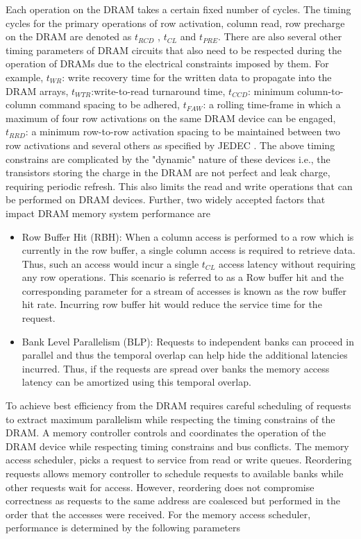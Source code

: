 \par Each operation on the DRAM takes a certain fixed number of cycles. The timing cycles for the primary operations of row activation, column read, row precharge on the DRAM are denoted as $t_{RCD}$ , $t_{CL}$ and $t_{PRE}$. There are also several other timing parameters of DRAM circuits that also need to be respected during the operation of DRAMs due to the electrical constraints imposed by them. For example, $t_{WR}$: write recovery time for the written data to propagate into the DRAM arrays, $t_{WTR}$:write-to-read turnaround time, $t_{CCD}$: minimum column-to-column command spacing to be adhered, $t_{FAW}$: a rolling time-frame in which a maximum of four row activations on the same DRAM device can be engaged, $t_{RRD}$: a minimum row-to-row activation spacing to be maintained between two row activations and several others as specified by JEDEC \cite{jedec-ddr3}. The above timing constrains are complicated by the "dynamic" nature of these devices i.e., the transistors storing the charge in the DRAM are not perfect and leak charge, requiring periodic refresh. This also limits the read and write operations that can be performed on DRAM devices.
Further, two widely accepted factors that impact DRAM memory system performance are
\begin{itemize}
	\item Row Buffer Hit (RBH): When a column access is performed to a row which is currently in the row buffer, a single column access is required to retrieve data. Thus, such an access would incur a single $t_{CL}$ access latency without requiring any row operations. This scenario is referred to as a Row buffer hit and the corresponding parameter for a stream of accesses is known as the row buffer hit rate. Incurring row buffer hit would reduce the service time for the request. 
	\item Bank Level Parallelism (BLP): Requests to independent banks can proceed in parallel and thus the temporal overlap can help hide the additional latencies incurred. Thus, if the requests are spread over banks the memory access latency can be amortized using this temporal overlap.
\end{itemize}
\par To achieve best efficiency from the DRAM requires careful scheduling of requests to extract maximum parallelism while respecting the timing constrains of the DRAM. A memory controller controls and coordinates the operation of the DRAM device while respecting timing constrains and bus conflicts. The memory access scheduler, picks a request to service from read or write queues. Reordering requests allows memory controller to schedule requests to available banks while other requests wait for access. However, reordering does not compromise correctness as requests to the same address are coalesced but performed in the order that the accesses were received. For the memory access scheduler, performance is determined by the following parameters
